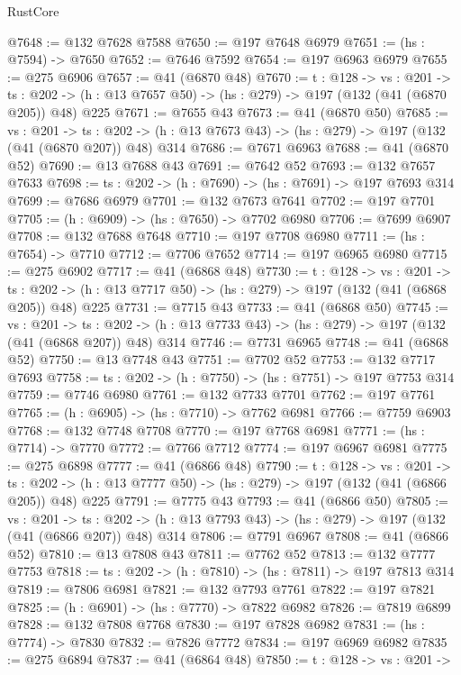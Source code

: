 \begin{lexlean}{RustCore}
\begin{coremodule}
@7648 := @132 @7628 @7588
@7650 := @197 @7648 @6979
@7651 := (hs : @7594) -> @7650
@7652 := @7646 @7592
@7654 := @197 @6963 @6979
@7655 := @275 @6906
@7657 := @41 (@6870 @48)
@7670 := {t : @128} ->
  {vs : @201} ->
  {ts : @202} -> (h : @13 @7657 @50) -> (hs : @279) -> @197 (@132 (@41 (@6870 @205)) @48) @225
@7671 := @7655 @43
@7673 := @41 (@6870 @50)
@7685 := {vs : @201} ->
  {ts : @202} -> (h : @13 @7673 @43) -> (hs : @279) -> @197 (@132 (@41 (@6870 @207)) @48) @314
@7686 := @7671 @6963
@7688 := @41 (@6870 @52)
@7690 := @13 @7688 @43
@7691 := @7642 @52
@7693 := @132 @7657 @7633
@7698 := {ts : @202} -> (h : @7690) -> (hs : @7691) -> @197 @7693 @314
@7699 := @7686 @6979
@7701 := @132 @7673 @7641
@7702 := @197 @7701
@7705 := (h : @6909) -> (hs : @7650) -> @7702 @6980
@7706 := @7699 @6907
@7708 := @132 @7688 @7648
@7710 := @197 @7708 @6980
@7711 := (hs : @7654) -> @7710
@7712 := @7706 @7652
@7714 := @197 @6965 @6980
@7715 := @275 @6902
@7717 := @41 (@6868 @48)
@7730 := {t : @128} ->
  {vs : @201} ->
  {ts : @202} -> (h : @13 @7717 @50) -> (hs : @279) -> @197 (@132 (@41 (@6868 @205)) @48) @225
@7731 := @7715 @43
@7733 := @41 (@6868 @50)
@7745 := {vs : @201} ->
  {ts : @202} -> (h : @13 @7733 @43) -> (hs : @279) -> @197 (@132 (@41 (@6868 @207)) @48) @314
@7746 := @7731 @6965
@7748 := @41 (@6868 @52)
@7750 := @13 @7748 @43
@7751 := @7702 @52
@7753 := @132 @7717 @7693
@7758 := {ts : @202} -> (h : @7750) -> (hs : @7751) -> @197 @7753 @314
@7759 := @7746 @6980
@7761 := @132 @7733 @7701
@7762 := @197 @7761
@7765 := (h : @6905) -> (hs : @7710) -> @7762 @6981
@7766 := @7759 @6903
@7768 := @132 @7748 @7708
@7770 := @197 @7768 @6981
@7771 := (hs : @7714) -> @7770
@7772 := @7766 @7712
@7774 := @197 @6967 @6981
@7775 := @275 @6898
@7777 := @41 (@6866 @48)
@7790 := {t : @128} ->
  {vs : @201} ->
  {ts : @202} -> (h : @13 @7777 @50) -> (hs : @279) -> @197 (@132 (@41 (@6866 @205)) @48) @225
@7791 := @7775 @43
@7793 := @41 (@6866 @50)
@7805 := {vs : @201} ->
  {ts : @202} -> (h : @13 @7793 @43) -> (hs : @279) -> @197 (@132 (@41 (@6866 @207)) @48) @314
@7806 := @7791 @6967
@7808 := @41 (@6866 @52)
@7810 := @13 @7808 @43
@7811 := @7762 @52
@7813 := @132 @7777 @7753
@7818 := {ts : @202} -> (h : @7810) -> (hs : @7811) -> @197 @7813 @314
@7819 := @7806 @6981
@7821 := @132 @7793 @7761
@7822 := @197 @7821
@7825 := (h : @6901) -> (hs : @7770) -> @7822 @6982
@7826 := @7819 @6899
@7828 := @132 @7808 @7768
@7830 := @197 @7828 @6982
@7831 := (hs : @7774) -> @7830
@7832 := @7826 @7772
@7834 := @197 @6969 @6982
@7835 := @275 @6894
@7837 := @41 (@6864 @48)
@7850 := {t : @128} ->
  {vs : @201} ->

\end{coremodule}
\end{lexlean}
